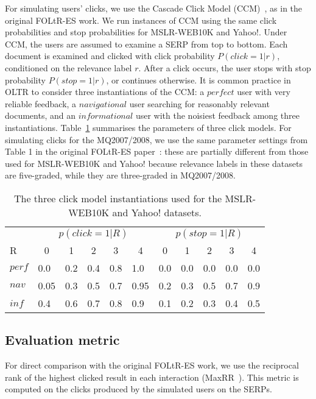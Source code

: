 For simulating users' clicks, we use the Cascade Click Model (CCM)~\cite{DBLP:conf/wsdm/GuoLW09}, as in the original FOLtR-ES work. We run instances of CCM using the same click probabilities and stop probabilities for MSLR-WEB10K and Yahoo!. Under CCM, the users are assumed to examine a SERP from top to bottom. Each document is examined and clicked with click probability $P(click = 1 | r)$, conditioned on the relevance label $r$. After a click occurs, the user stops with stop probability $P(stop = 1 | r)$, or continues otherwise. It is common practice in OLTR to consider three instantiations of the CCM: a $perfect$ user with very reliable feedback, a $navigational$ user searching for reasonably relevant documents, and an $informational$ user with the noisiest feedback among three instantiations.  Table~\ref{mslr-CCM} summarises the parameters of three click models. For simulating clicks for the MQ2007/2008, we use the same parameter settings from Table 1 in the original FOLtR-ES paper~\cite{kharitonov2019federated}: these are partially different from those used for MSLR-WEB10K and Yahoo! because relevance labels in these datasets are five-graded, while they are three-graded in MQ2007/2008.

\newcommand{\tc}[1]{\multicolumn{1}{c}{#1}}
\setlength{\tabcolsep}{3mm}

\begin{table}[t!]
	\centering
	\caption[centre]{The three click model instantiations used for the MSLR-WEB10K and Yahoo! datasets.}\label{mslr-CCM}
	\begin{tabularx}{\textwidth}{XXXXXXXXXXX}
		\toprule
		& \multicolumn{5}{c}{$p(click=1|R)$} & \multicolumn{5}{c}{$p(stop=1|R)$} \\
		\cmidrule(r){2-6}  \cmidrule(){7-11}
		R & \tc{0}& \tc{1} &\tc{2} & \tc{3}& \tc{4}&  \tc{0} & \tc{1} & \tc{2} & \tc{3} & \tc{4} \\
		\midrule
		$perf$ & 0.0 & 0.2 & 0.4 & 0.8 & 1.0& 0.0 & 0.0 & 0.0 & 0.0 & 0.0\\
		$nav$ & 0.05 & 0.3 & 0.5 & 0.7 & 0.95& 0.2 & 0.3 & 0.5 & 0.7 & 0.9\\
		$inf$ & 0.4 & 0.6 & 0.7 & 0.8 & 0.9& 0.1 & 0.2 & 0.3 & 0.4 & 0.5\\
		\bottomrule
	\end{tabularx}
	\vspace{-10pt}
\end{table}

\subsection{Evaluation metric}
For direct comparison with the original FOLtR-ES work, we use the reciprocal rank of the highest clicked result in each interaction (MaxRR~\cite{radlinski2008learning}). This metric is computed on the clicks produced by the simulated users on the SERPs. 

